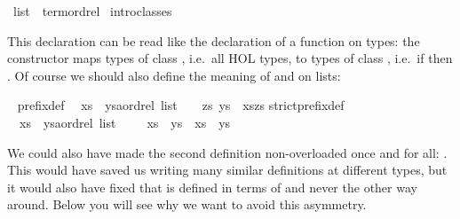 %
\begin{isabellebody}%
\def\isabellecontext{Overloading}%
\ list\ {\isacharcolon}{\isacharcolon}\ {\isacharparenleft}{\isachardoublequote}term{\isachardoublequote}{\isacharparenright}ordrel\isanewline
{}\ intro{\isacharunderscore}classes%
\begin{isamarkuptext}%
\noindent
This  declaration can be read like the declaration of
a function on types: the constructor  maps types of class , i.e.\ all HOL types, to types of class , i.e.\
if  then .
Of course we should also define the meaning of \isa{{\isacharless}{\isacharless}{\isacharequal}} and
\isa{{\isacharless}{\isacharless}} on lists:%
\end{isamarkuptext}%
\ {\isacharparenleft}\isanewline
prefix{\isacharunderscore}def{\isacharcolon}\isanewline
\ \ {\isachardoublequote}xs\ {\isacharless}{\isacharless}{\isacharequal}\ {\isacharparenleft}ys{\isacharcolon}{\isacharcolon}{\isacharprime}a{\isacharcolon}{\isacharcolon}ordrel\ list{\isacharparenright}\ \ {\isasymequiv}\ \ {\isasymexists}zs{\isachardot}\ ys\ {\isacharequal}\ xs{\isacharat}zs{\isachardoublequote}\isanewline
strict{\isacharunderscore}prefix{\isacharunderscore}def{\isacharcolon}\isanewline
\ \ {\isachardoublequote}xs\ {\isacharless}{\isacharless}\ {\isacharparenleft}ys{\isacharcolon}{\isacharcolon}{\isacharprime}a{\isacharcolon}{\isacharcolon}ordrel\ list{\isacharparenright}\ \ \ {\isasymequiv}\ \ xs\ {\isacharless}{\isacharless}{\isacharequal}\ ys\ {\isasymand}\ xs\ {\isasymnoteq}\ ys{\isachardoublequote}%
\begin{isamarkuptext}%
We could also have made the second definition non-overloaded once and for
all: .  This would have saved us writing
many similar definitions at different types, but it would also have fixed
that \isa{{\isacharless}{\isacharless}} is defined in terms of \isa{{\isacharless}{\isacharless}{\isacharequal}} and never the other way
around. Below you will see why we want to avoid this asymmetry.%
\end{isamarkuptext}%
\end{isabellebody}%
